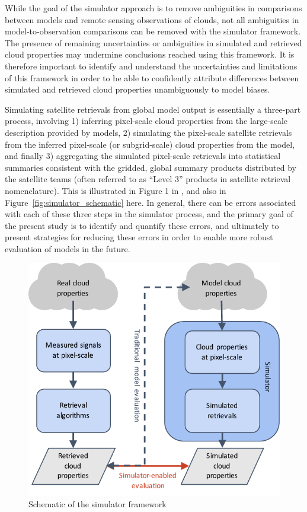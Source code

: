 While the goal of the simulator approach is to remove ambiguities in
comparisons between models and remote sensing observations of clouds,
not all ambiguities in model-to-observation comparisons can be removed
with the simulator framework. The presence of remaining uncertainties or
ambiguities in simulated and retrieved cloud properties may undermine
conclusions reached using this framework. It is therefore important to
identify and understand the uncertainties and limitations of this
framework in order to be able to confidently attribute differences
between simulated and retrieved cloud properties unambiguously to model
biases.

Simulating satellite retrievals from global model output is essentially
a three-part process, involving 1) inferring pixel-scale cloud
properties from the large-scale description provided by models, 2)
simulating the pixel-scale satellite retrievals from the inferred
pixel-scale (or subgrid-scale) cloud properties from the model, and
finally 3) aggregating the simulated pixel-scale retrievals into
statistical summaries consistent with the gridded, global summary
products distributed by the satellite teams (often referred to as
``Level 3'' products in satellite retrieval nomenclature). This is
illustrated in Figure 1 in \citet{bodas-salcedo_et_al_2011}, and also in
Figure~\ref{fig:simulator_schematic} here. In general, there can be
errors associated with each of these three steps in the simulator
process, and the primary goal of the present study is to identify and
quantify these errors, and ultimately to present strategies for reducing
these errors in order to enable more robust evaluation of models in the
future.

\begin{figure}[tp]
\centering
\includegraphics{graphics/simulator_schematic.pdf}
\caption{\label{fig:simulator_schematic}Schematic of the simulator
framework}\label{fig:simulatorux5fschematic}
\end{figure}

